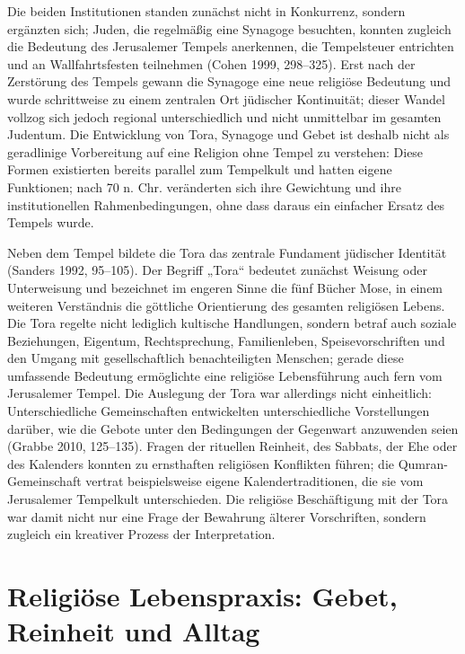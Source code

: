 \documentclass[fontsize=12pt]{mybib}
\begin{document}
Die beiden Institutionen standen zunächst nicht in Konkurrenz, sondern ergänzten sich; Juden, die regelmäßig eine Synagoge besuchten, konnten zugleich die Bedeutung des Jerusalemer Tempels anerkennen, die Tempelsteuer entrichten und an Wallfahrtsfesten teilnehmen (Cohen 1999, 298–325). Erst nach der Zerstörung des Tempels gewann die Synagoge eine neue religiöse Bedeutung und wurde schrittweise zu einem zentralen Ort jüdischer Kontinuität; dieser Wandel vollzog sich jedoch regional unterschiedlich und nicht unmittelbar im gesamten Judentum. Die Entwicklung von Tora, Synagoge und Gebet ist deshalb nicht als geradlinige Vorbereitung auf eine Religion ohne Tempel zu verstehen: Diese Formen existierten bereits parallel zum Tempelkult und hatten eigene Funktionen; nach 70 n. Chr. veränderten sich ihre Gewichtung und ihre institutionellen Rahmenbedingungen, ohne dass daraus ein einfacher Ersatz des Tempels wurde.

Neben dem Tempel bildete die Tora das zentrale Fundament jüdischer Identität (Sanders 1992, 95–105). Der Begriff „Tora“ bedeutet zunächst Weisung oder Unterweisung und bezeichnet im engeren Sinne die fünf Bücher Mose, in einem weiteren Verständnis die göttliche Orientierung des gesamten religiösen Lebens. Die Tora regelte nicht lediglich kultische Handlungen, sondern betraf auch soziale Beziehungen, Eigentum, Rechtsprechung, Familienleben, Speisevorschriften und den Umgang mit gesellschaftlich benachteiligten Menschen; gerade diese umfassende Bedeutung ermöglichte eine religiöse Lebensführung auch fern vom Jerusalemer Tempel. Die Auslegung der Tora war allerdings nicht einheitlich: Unterschiedliche Gemeinschaften entwickelten unterschiedliche Vorstellungen darüber, wie die Gebote unter den Bedingungen der Gegenwart anzuwenden seien (Grabbe 2010, 125–135). Fragen der rituellen Reinheit, des Sabbats, der Ehe oder des Kalenders konnten zu ernsthaften religiösen Konflikten führen; die Qumran-Gemeinschaft vertrat beispielsweise eigene Kalendertraditionen, die sie vom Jerusalemer Tempelkult unterschieden. Die religiöse Beschäftigung mit der Tora war damit nicht nur eine Frage der Bewahrung älterer Vorschriften, sondern zugleich ein kreativer Prozess der Interpretation.

\section{Religiöse Lebenspraxis: Gebet, Reinheit und Alltag}
\end{document}

